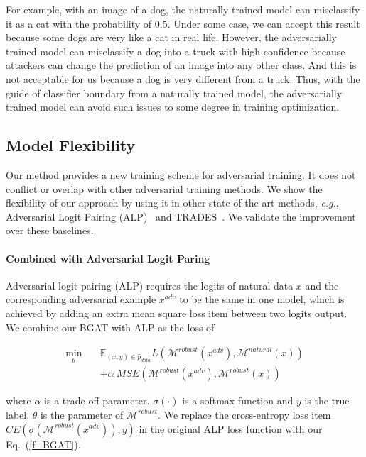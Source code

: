 \documentclass[10pt,twocolumn,letterpaper]{article}
\begin{document}
For example, with an image of a dog, the naturally trained model can misclassify it as a cat with the probability of 0.5. Under some case, we can accept this result because
some dogs are very like a cat in real life. However, the adversarially trained model can misclassify a dog into a truck with high confidence because attackers can change the prediction of an image into any other class. And this is not acceptable for us because a dog is very different from
a truck. Thus, with the guide of classifier boundary from a naturally trained model, the adversarially trained model can avoid such issues to some degree in training optimization.

\subsection{Model Flexibility}
Our method provides a new training scheme for adversarial training. It does not conflict or overlap with other adversarial training methods. We show the flexibility of our approach by using it in other state-of-the-art methods, {\it e.g.}, Adversarial Logit Pairing (ALP)~\cite{DBLP:journals/corr/abs-1803-06373} and TRADES~\cite{zhang2019theoretically}. We validate the improvement over these baselines.

\paragraph{Combined with Adversarial Logit Paring}
Adversarial logit pairing (ALP) requires the logits of natural data $x$ and the corresponding adversarial example $x^{adv}$ to be the same in one model, which is achieved by adding an extra mean square loss item between two logits output. We combine our BGAT with ALP as the loss of
\begin{small}
	\begin{align}
	\mathop{\min}_{\theta} \quad & \mathbb{E}_{(x,y) \in \hat{p}_{data}} L\left(\mathcal{M}^{robust}(x^{adv}), \mathcal{M}^{natural}(x)\right) \nonumber \\
	&+ \alpha~MSE\left(\mathcal{M}^{robust}(x^{adv}), \mathcal{M}^{robust}(x)\right) \label{f_BGAT_ALP}
	\end{align}
\end{small}
where $\alpha$ is a trade-off parameter. $\sigma(\cdot)$ is a softmax function and $y$ is the true label. $\theta$ is the parameter of $\mathcal{M}^{robust}$. We replace the cross-entropy loss item $CE(\sigma(\mathcal{M}^{robust}(x^{adv})),y)$ in the original ALP loss function with our Eq.~(\ref{f_BGAT}).
\end{document}

